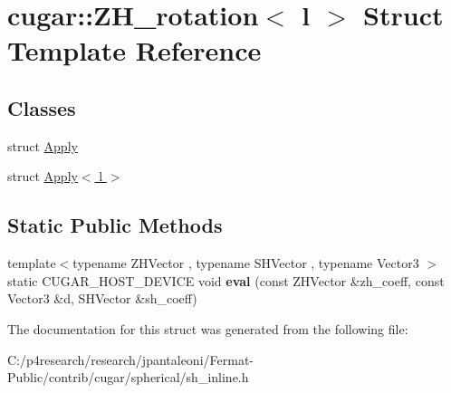 \hypertarget{structcugar_1_1_z_h__rotation}{}\section{cugar\+:\+:Z\+H\+\_\+rotation$<$ l $>$ Struct Template Reference}
\label{structcugar_1_1_z_h__rotation}
\subsection*{Classes}
\begin{DoxyCompactItemize}
\item 
struct \hyperlink{structcugar_1_1_z_h__rotation_1_1_apply}{Apply}
\item 
struct \hyperlink{structcugar_1_1_z_h__rotation_1_1_apply_3_01l_01_4}{Apply$<$ l $>$}
\end{DoxyCompactItemize}
\subsection*{Static Public Methods}
\begin{DoxyCompactItemize}
\item 
\mbox{\label{structcugar_1_1_z_h__rotation_ac4ec27d1921777de4107b392eb259deb}} 
{\footnotesize template$<$typename Z\+H\+Vector , typename S\+H\+Vector , typename Vector3 $>$ }\\static C\+U\+G\+A\+R\+\_\+\+H\+O\+S\+T\+\_\+\+D\+E\+V\+I\+CE void {\bfseries eval} (const Z\+H\+Vector \&zh\+\_\+coeff, const Vector3 \&d, S\+H\+Vector \&sh\+\_\+coeff)
\end{DoxyCompactItemize}


The documentation for this struct was generated from the following file\+:\begin{DoxyCompactItemize}
\item 
C\+:/p4research/research/jpantaleoni/\+Fermat-\/\+Public/contrib/cugar/spherical/sh\+\_\+inline.\+h\end{DoxyCompactItemize}
